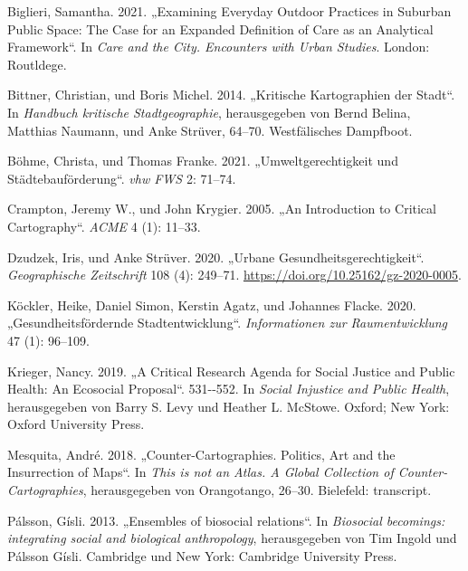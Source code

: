 \documentclass[
  ngerman,
]{article}
\newlength{\cslhangindent}
\newlength{\cslentryspacingunit} %
\newenvironment{CSLReferences}[2] %
 {%
  \setlength{\parindent}{0pt}
  \ifodd #1
  \let\oldpar\par
  \def\par{\hangindent=\cslhangindent\oldpar}
  \fi
  \setlength{\parskip}{#2\cslentryspacingunit}
 }%
 {}
\begin{document}
\hypertarget{refs}{}
\begin{CSLReferences}{1}{0}
\leavevmode{}%
Biglieri, Samantha. 2021. {„Examining Everyday Outdoor Practices in Suburban Public Space: The Case for an Expanded Definition of Care as an Analytical Framework``}. In \emph{Care and the City. Encounters with Urban Studies}. London: Routldege.

\leavevmode{}%
Bittner, Christian, und Boris Michel. 2014. {„Kritische Kartographien der Stadt``}. In \emph{Handbuch kritische Stadtgeographie}, herausgegeben von Bernd Belina, Matthias Naumann, und Anke Strüver, 64--70. {Westf{ä}lisches Dampfboot}.

\leavevmode{}%
Böhme, Christa, und Thomas Franke. 2021. {„Umweltgerechtigkeit und St{ä}dtebauf{ö}rderung``}. \emph{vhw FWS} 2: 71--74.

\leavevmode{}%
Crampton, Jeremy W., und John Krygier. 2005. {„An Introduction to Critical Cartography``}. \emph{ACME} 4 (1): 11--33.

\leavevmode{}%
Dzudzek, Iris, und Anke Strüver. 2020. {„Urbane Gesundheitsgerechtigkeit``}. \emph{Geographische Zeitschrift} 108 (4): 249--71. \url{https://doi.org/10.25162/gz-2020-0005}.

\leavevmode{}%
Köckler, Heike, Daniel Simon, Kerstin Agatz, und Johannes Flacke. 2020. {„Gesundheitsf{ö}rdernde Stadtentwicklung``}. \emph{Informationen zur Raumentwicklung} 47 (1): 96--109.

\leavevmode{}%
Krieger, Nancy. 2019. {„A Critical Research Agenda for Social Justice and Public Health: An Ecosocial Proposal``}. 531-\/-552. In \emph{Social Injustice and Public Health}, herausgegeben von Barry S. Levy und Heather L. McStowe. Oxford; New York: Oxford University Press.

\leavevmode{}%
Mesquita, André. 2018. {„Counter-Cartographies. Politics, Art and the Insurrection of Maps``}. In \emph{This is not an Atlas. A Global Collection of Counter-Cartographies}, herausgegeben von Orangotango, 26--30. Bielefeld: transcript.

\leavevmode{}%
Pálsson, Gísli. 2013. {„Ensembles of biosocial relations``}. In \emph{Biosocial becomings: integrating social and biological anthropology}, herausgegeben von Tim Ingold und Pálsson Gísli. Cambridge und New York: {Cambridge University Press}.


\end{CSLReferences}
\end{document}
